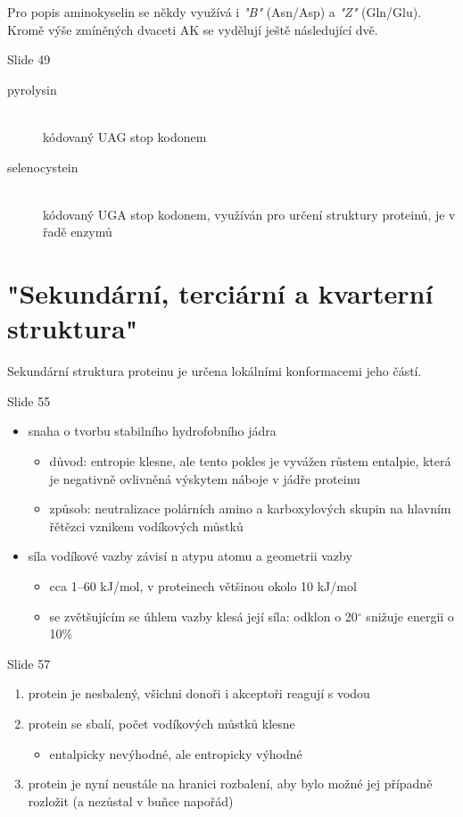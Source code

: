 \documentclass[DIV=8]{scrreprt}
\begin{document}
Pro popis aminokyselin se někdy využívá i \emph{"B"} (Asn/Asp) a \emph{"Z"} (Gln/Glu). Kromě výše zmíněných dvaceti AK se vydělují ještě následující dvě.

Slide 49
\begin{description}
\item[pyrolysin]\hfill \\
kódovaný UAG stop kodonem


\item[selenocystein]\hfill \\
kódovaný UGA stop kodonem, využíván pro určení struktury proteinů, je v řadě enzymů

\end{description}


\section{"Sekundární, terciární a kvarterní struktura"}

Sekundární struktura proteinu je určena lokálními konformacemi jeho částí.

Slide 55
\begin{itemize}
    \item snaha o tvorbu stabilního hydrofobního jádra
\begin{itemize}
    \item důvod: entropie klesne, ale tento pokles je vyvážen růstem entalpie, která je negativně ovlivněná výskytem náboje v jádře proteinu
    \item způsob: neutralizace polárních amino a karboxylových skupin na hlavním řětězci vznikem vodíkových můstků
\end{itemize}

\end{itemize}


\begin{itemize}
    \item síla vodíkové vazby závisí n atypu atomu a geometrii vazby
\begin{itemize}
    \item cca 1--60 kJ/mol, v proteinech většinou okolo 10 kJ/mol
    \item se zvětšujícím se úhlem vazby klesá její síla: odklon o 20\(^{\circ}\) snižuje energii o 10\%
\end{itemize}

\end{itemize}


Slide 57
\begin{enumerate}
    \item protein je nesbalený, všichni donoři i akceptoři reagují s vodou
    \item protein se sbalí, počet vodíkových můstků klesne
\begin{itemize}
    \item entalpicky nevýhodné, ale entropicky výhodné
\end{itemize}

    \item protein je nyní neustále na hranici rozbalení, aby bylo možné jej případně rozložit (a nezůstal v buňce napořád)
\end{enumerate}
\end{document}
